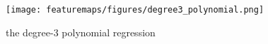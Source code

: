 \begin{answer}
\begin{figure}[htbp]
  \centering
  \texttt{[image: featuremaps/figures/degree3\_polynomial.png]}
  \caption{the degree-3 polynomial regression }
  \label{fig:polynomial regression}
\end{figure}
\end{answer} 

